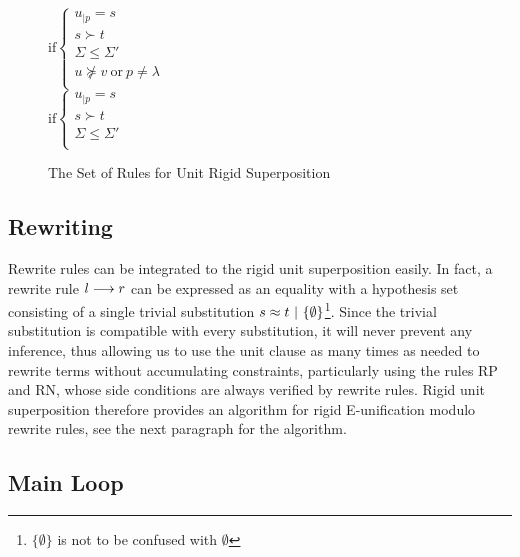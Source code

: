 \begin{figure}[htb]
\begin{center}
\doubleLine{}
\DP
$\text{if} \left\{\begin{array}{l}
u_{|p} = s\\
s \succ t\\
\Sigma \leq \Sigma'\\
u \not\succeq v ~ \text{or} ~ p \neq \lambda\\
\end{array}\right.$\\[12pt]

\doubleLine{}
\DP
$\text{if} \left\{\begin{array}{l}
u_{|p} = s\\
s \succ t\\
\Sigma \leq \Sigma'\\
\end{array}\right.$
\caption{The Set of Rules for Unit Rigid Superposition}
\label{fig:unit-sup-rules}
\end{center}
\end{figure}

\subsection{Rewriting}

Rewrite rules can be integrated to the rigid unit superposition easily. In fact,
a rewrite rule $l\longrightarrow{}r$ can be expressed as an equality with a hypothesis set
consisting of a single trivial substitution
$s\approx{}t ~|~ \{\emptyset\}$\footnote{$\{\emptyset\}$ is not to be confused with $\emptyset$}.
Since the trivial substitution is compatible
with every substitution, it will never prevent any inference, thus allowing us
to use the unit clause as many times as needed to rewrite terms without
accumulating constraints, particularly using the rules RP and RN, whose side
conditions are always verified by rewrite rules. Rigid unit superposition
therefore provides an algorithm for rigid E-unification modulo rewrite rules,
see the next paragraph for the algorithm.

\subsection{Main Loop}


